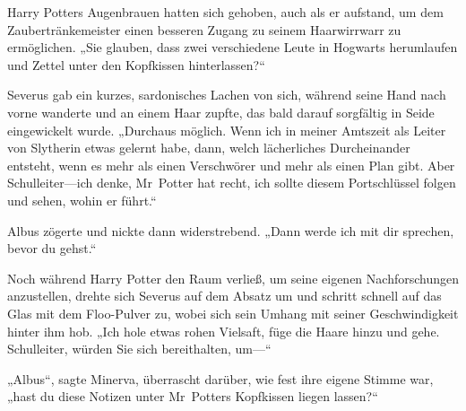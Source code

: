 Harry Potters Augenbrauen hatten sich gehoben, auch als er aufstand, um dem Zaubertränkemeister einen besseren Zugang zu seinem Haarwirrwarr zu ermöglichen.
„Sie glauben, dass zwei verschiedene Leute in Hogwarts herumlaufen und Zettel unter den Kopfkissen hinterlassen?“

Severus gab ein kurzes, sardonisches Lachen von sich, während seine Hand nach vorne wanderte und an einem Haar zupfte, das bald darauf sorgfältig in Seide eingewickelt wurde.
„Durchaus möglich. Wenn ich in meiner Amtszeit als Leiter von Slytherin etwas gelernt habe, dann, welch lächerliches Durcheinander entsteht, wenn es mehr als einen Verschwörer und mehr als einen Plan gibt. Aber Schulleiter—ich denke, Mr~Potter hat recht, ich sollte diesem Portschlüssel folgen und sehen, wohin er führt.“

Albus zögerte und nickte dann widerstrebend. „Dann werde ich mit dir sprechen, bevor du gehst.“

\later

Noch während Harry Potter den Raum verließ, um seine eigenen Nachforschungen anzustellen, drehte sich Severus auf dem Absatz um und schritt schnell auf das Glas mit dem Floo-Pulver zu, wobei sich sein Umhang mit seiner Geschwindigkeit hinter ihm hob. „Ich hole etwas rohen Vielsaft, füge die Haare hinzu und gehe. Schulleiter, würden Sie sich bereithalten, um—“

„Albus“, sagte Minerva, überrascht darüber, wie fest ihre eigene Stimme war, „hast du diese Notizen unter Mr~Potters Kopfkissen liegen lassen?“

